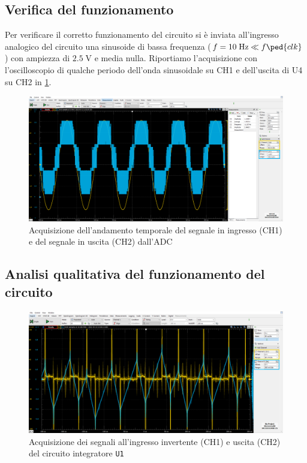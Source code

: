 \documentclass[10pt, a4paper, italian]{article}
\begin{document}
\subsection{Verifica del funzionamento}
Per verificare il corretto funzionamento del circuito si è inviata all'ingresso
analogico del circuito una sinusoide di bassa frequenza ($f = 10 \; \si{\Hz}
 \ll f\ped{clk}$) con ampiezza di $2.5 \; \si{\V}$ e media nulla.
Riportiamo l'acquisizione con l'oscilloscopio di qualche periodo dell'onda
sinusoidale su CH1 e dell'uscita di U4 su CH2 in \cref{fig: verif}.
\begin{figure}[htbp]
    \centering
	\includegraphics[width=\textwidth]{sin10hz2.5v}
    \caption{Acquisizione dell'andamento temporale del segnale in ingresso
    (CH1) e del segnale in uscita (CH2) dall'ADC
    \label{fig: verif}}
\end{figure}

\subsection{Analisi qualitativa del funzionamento del circuito}
\begin{figure}[htbp]
    \centering
	\includegraphics[width=\textwidth]{MIDDLE.U1.InputVSOutput}
    \caption{Acquisizione dei segnali all'ingresso invertente (CH1) e uscita (CH2)
    del circuito integratore \texttt{U1}}
\end{figure}
\end{document}
